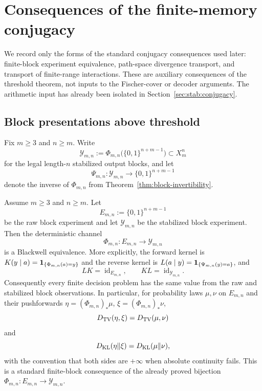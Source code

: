 \section{Consequences of the finite-memory conjugacy}\label{sec:measurement}

We record only the forms of the standard conjugacy consequences used later:
finite-block experiment equivalence, path-space divergence transport, and
transport of finite-range interactions. These are auxiliary consequences of
the threshold theorem, not inputs to the Fischer-cover or decoder arguments.
The arithmetic input has already been isolated in
Section~\ref{sec:stab:conjugacy}.

\subsection{Block presentations above threshold}\label{sec:measurement:sufficiency}

Fix $m\ge 3$ and $n\ge m$.  Write
\[
\mathcal Y_{m,n}:=\Phi_{m,n}\bigl(\{0,1\}^{n+m-1}\bigr)\subset X_m^n
\]
for the legal length-$n$ stabilized output blocks, and let
\[
\Psi_{m,n}:\mathcal Y_{m,n}\to\{0,1\}^{n+m-1}
\]
denote the inverse of $\Phi_{m,n}$ from Theorem~\ref{thm:block-invertibility}.

\begin{theorem}\label{thm:exact-sufficiency}
Assume $m\ge3$ and $n\ge m$.  Let
\[
E_{m,n}:=\{0,1\}^{n+m-1}
\]
be the raw block experiment and let $\mathcal Y_{m,n}$ be the stabilized
block experiment.  Then the deterministic channel
\[
\Phi_{m,n}:E_{m,n}\to\mathcal Y_{m,n}
\]
is a Blackwell equivalence.  More explicitly, the forward kernel is
$K(y\mid a)=\mathbf{1}_{\{\Phi_{m,n}(a)=y\}}$ and the reverse kernel is
$L(a\mid y)=\mathbf{1}_{\{\Psi_{m,n}(y)=a\}}$, and
\[
LK=\operatorname{id}_{E_{m,n}},\qquad KL=\operatorname{id}_{\mathcal Y_{m,n}}.
\]
Consequently every finite decision problem has the same value from the raw and
stabilized block observations.  In particular, for probability laws $\mu,\nu$
on $E_{m,n}$ and their pushforwards
$\eta=(\Phi_{m,n})_*\mu$, $\xi=(\Phi_{m,n})_*\nu$,
\[
D_{\mathrm{TV}}(\eta,\xi)=D_{\mathrm{TV}}(\mu,\nu)
\]
and
\[
D_{\mathrm{KL}}(\eta\|\xi)=D_{\mathrm{KL}}(\mu\|\nu),
\]
with the convention that both sides are $+\infty$ when absolute continuity
fails.
This is a standard finite-block consequence of the already proved bijection
$\Phi_{m,n}:E_{m,n}\to\mathcal Y_{m,n}$.
\end{theorem}

